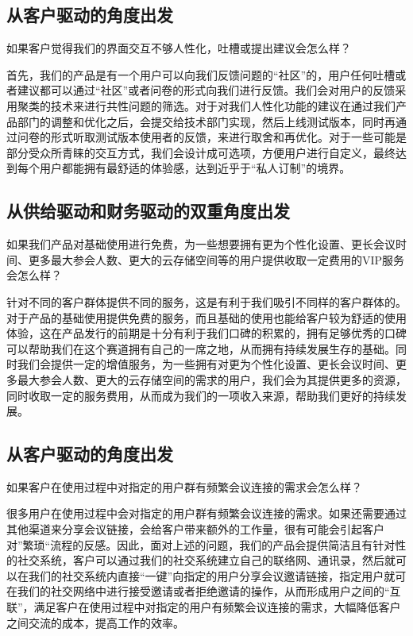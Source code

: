 \documentclass[a4paper,12pt]{article}
\begin{document}
    \subsection{从客户驱动的角度出发}
    如果客户觉得我们的界面交互不够人性化，吐槽或提出建议会怎么样？

    首先，我们的产品是有一个用户可以向我们反馈问题的“社区”的，用户任何吐槽或者建议都可以通过“社区”或者问卷的形式向我们进行反馈。我们会对用户的反馈采用聚类的技术来进行共性问题的筛选。对于对我们人性化功能的建议在通过我们产品部门的调整和优化之后，会提交给技术部门实现，然后上线测试版本，同时再通过问卷的形式听取测试版本使用者的反馈，来进行取舍和再优化。对于一些可能是部分受众所青睐的交互方式，我们会设计成可选项，方便用户进行自定义，最终达到每个用户都能拥有最舒适的体验感，达到近乎于“私人订制”的境界。

    \subsection{从供给驱动和财务驱动的双重角度出发}
    如果我们产品对基础使用进行免费，为一些想要拥有更为个性化设置、更长会议时间、更多最大参会人数、更大的云存储空间等的用户提供收取一定费用的VIP服务会怎么样？

    针对不同的客户群体提供不同的服务，这是有利于我们吸引不同样的客户群体的。对于产品的基础使用提供免费的服务，而且基础的使用也能给客户较为舒适的使用体验，这在产品发行的前期是十分有利于我们口碑的积累的，拥有足够优秀的口碑可以帮助我们在这个赛道拥有自己的一席之地，从而拥有持续发展生存的基础。同时我们会提供一定的增值服务，为一些拥有对更为个性化设置、更长会议时间、更多最大参会人数、更大的云存储空间的需求的用户，我们会为其提供更多的资源，同时收取一定的服务费用，从而成为我们的一项收入来源，帮助我们更好的持续发展。

    \subsection{从客户驱动的角度出发}
    如果客户在使用过程中对指定的用户群有频繁会议连接的需求会怎么样？

    很多用户在使用过程中会对指定的用户群有频繁会议连接的需求。如果还需要通过其他渠道来分享会议链接，会给客户带来额外的工作量，很有可能会引起客户对”繁琐“流程的反感。因此，面对上述的问题，我们的产品会提供简洁且有针对性的社交系统，客户可以通过我们的社交系统建立自己的联络网、通讯录，然后就可以在我们的社交系统内直接“一键”向指定的用户分享会议邀请链接，指定用户就可在我们的社交网络中进行接受邀请或者拒绝邀请的操作，从而形成用户之间的“互联”，满足客户在使用过程中对指定的用户有频繁会议连接的需求，大幅降低客户之间交流的成本，提高工作的效率。
\end{document}
